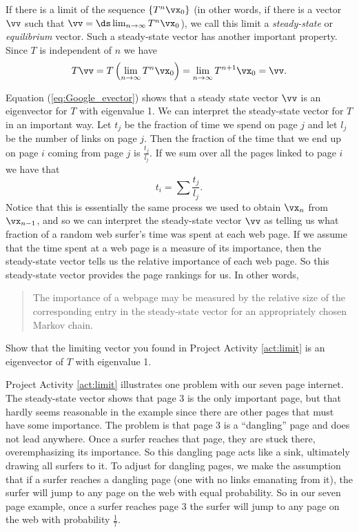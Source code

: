 If there is a limit of the sequence $\{T^n\vx_0\}$ (in other words, if there is a vector $\vv$ such that $\vv = \ds \lim_{n \to \infty} T^n \vx_0$), we call this limit a \emph{steady-state} or \emph{equilibrium} vector. Such a steady-state vector has another important property. Since $T$ is independent of $n$ we have 
\begin{equation} \label{eq:Google_evector}
T \vv = T\left(\lim_{n \to \infty} T^n \vx_0 \right) = \lim_{n \to \infty} T^{n+1} \vx_0 = \vv.
\end{equation}


Equation (\ref{eq:Google_evector}) shows that a steady state vector $\vv$ is an eigenvector for $T$ with eigenvalue 1. We can interpret the steady-state vector for $T$ in an important way. Let $t_j$ be the fraction of time we spend on page $j$ and let $l_j$ be the number of links on page $j$. Then the fraction of the time that we end up on page $i$ coming from page $j$ is $\frac{t_j}{l_j}$. If we sum over all the pages linked to page $i$ we have that
\[t_i = \sum \frac{t_j}{l_j}.\]
Notice that this is essentially the same process we used to obtain $\vx_n$ from $\vx_{n-1}$, and so we can interpret the steady-state vector $\vv$ as telling us what fraction of a random web surfer's time was spent at each web page. If we assume that the time spent at a web page is a measure of its importance, then the steady-state vector tells us the relative importance of each web page. So this steady-state vector provides the page rankings for us. In other words,
\begin{quote}
The importance of a webpage may be measured by the relative size of the corresponding entry in the steady-state vector for an appropriately chosen Markov chain.
\end{quote}


\begin{pactivity} Show that the limiting vector you found in Project Activity \ref{act:limit} is an eigenvector of $T$ with eigenvalue 1.


\end{pactivity}


Project Activity \ref{act:limit} illustrates one problem with our seven page internet. The steady-state vector shows that page 3 is the only important page, but that hardly seems reasonable in the example since there are other pages that must have some importance. The problem is that page 3 is a ``dangling'' page and does not lead anywhere. Once a surfer reaches that page, they are  stuck there, overemphasizing its importance. So this dangling page acts like a sink, ultimately drawing all surfers to it. To adjust for dangling pages, we make the assumption that if a surfer reaches a dangling page (one with no links emanating from it), the surfer will jump to any page on the web with equal probability. So in our seven page example, once a surfer reaches page 3 the surfer will jump to any page on the web with probability $\frac{1}{7}$.

